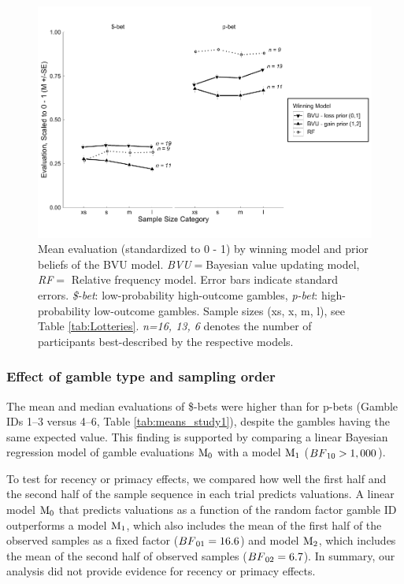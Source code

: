\documentclass[a4paper, man, floatsintext]{apa6}
\begin{document}
\begin{figure}[htb]

{\centering \includegraphics{../figures/qual1-1} 

}

\caption{Mean evaluation (standardized to 0 - 1) by winning model and prior beliefs of the BVU model. \textit{BVU}$=$Bayesian value updating model, \textit{RF}$=$ Relative frequency model. Error bars indicate standard errors. \textit{\$-bet}: low-probability high-outcome gambles, \textit{p-bet}: high-probability low-outcome gambles. Sample sizes (xs, x, m, l), see Table \ref{tab:Lotteries}. \textit{n=16, 13, 6} denotes the number of participants best-described by the respective models.}\label{fig:qual1}
\end{figure}

\subsubsection{Effect of gamble type and sampling order}

The mean and median evaluations of \$-bets were higher than for p-bets
(Gamble IDs 1--3 versus 4--6, Table \ref{tab:means_study1}), despite the
gambles having the same expected value. This finding is supported by
comparing a linear Bayesian regression model of gamble evaluations
\(\mathrm{M}\textsubscript{0}\)
 with a
model \(\mathrm{M}\textsubscript{1}\)
(\(BF\textsubscript{10} > 1,000\)).

To test for recency or primacy effects, we compared how well the first
half and the second half of the sample sequence in each trial predicts
valuations. A linear model \(\mathrm{M}\textsubscript{0}\) that predicts
valuations as a function of the random factor gamble ID outperforms a
model \(\mathrm{M}\textsubscript{1}\), which also includes the mean of
the first half of the observed samples as a fixed factor
(\(BF\textsubscript{01} = 16.6\)) and model
\(\mathrm{M}\textsubscript{2}\), which includes the mean of the second
half of observed samples (\(BF\textsubscript{02} = 6.7\)). In summary,
our analysis did not provide evidence for recency or primacy effects.
\end{document}
